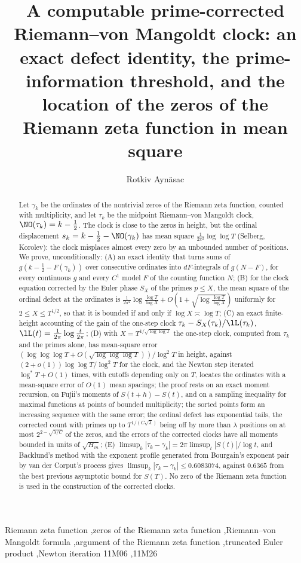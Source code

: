 

\begin{frontmatter}
\title{A computable prime-corrected Riemann--von Mangoldt clock: an exact defect identity, the prime-information threshold, and the location of the zeros of the Riemann zeta function in mean square}
\author{Rotkiv Ayn\"asac}

\begin{abstract}
Let $\gamma_k$ be the ordinates of the nontrivial zeros of the Riemann zeta function, counted with multiplicity, and let $\tau_k$ be the midpoint Riemann--von Mangoldt clock, $\NO(\tau_k)=k-\frac12$. The clock is close to the zeros in height, but the ordinal displacement $s_k=k-\frac12-\NO(\gamma_k)$ has mean square $\frac1{2\pi^2}\log\log T$ (Selberg, Korolev): the clock misplaces almost every zero by an unbounded number of positions. We prove, unconditionally: (A) an exact identity that turns sums of $g(k-\frac12-F(\gamma_k))$ over consecutive ordinates into $dF$-integrals of $g(N-F)$, for every continuous $g$ and every $C^1$ model $F$ of the counting function $N$; (B) for the clock equation corrected by the Euler phase $S_X$ of the primes $p\le X$, the mean square of the ordinal defect at the ordinates is $\frac1{2\pi^2}\log\frac{\log T}{\log X}+O(1+\sqrt{\log\frac{\log T}{\log X}})$ uniformly for $2\le X\le T^{1/2}$, so that it is bounded if and only if $\log X\asymp\log T$; (C) an exact finite-height accounting of the gain of the one-step clock $\tau_k-S_X(\tau_k)/\lL(\tau_k)$, $\lL(t)=\frac1{2\pi}\log\frac t{2\pi}$; (D) with $X=T^{1/\sqrt{\log\log T}}$ the one-step clock, computed from $\tau_k$ and the primes alone, has mean-square error $(\log\log\log T+O(\sqrt{\log\log\log T}))/\log^2T$ in height, against $(2+o(1))\log\log T/\log^2T$ for the clock, and the Newton step iterated $\log^*T+O(1)$ times, with cutoffs depending only on $T$, locates the ordinates with a mean-square error of $O(1)$ mean spacings; the proof rests on an exact moment recursion, on Fujii's moments of $S(t+h)-S(t)$, and on a sampling inequality for maximal functions at points of bounded multiplicity; the sorted points form an increasing sequence with the same error; the ordinal defect has exponential tails, the corrected count with primes up to $T^{1/(C\sqrt\lambda)}$ being off by more than $\lambda$ positions on at most $2^{2-\sqrt{\lambda/C}}$ of the zeros, and the errors of the corrected clocks have all moments bounded in units of $\sqrt{H_m}$; (E) $\limsup_k|\tau_k-\gamma_k|=2\pi\limsup_t|S(t)|/\log t$, and Backlund's method with the exponent profile generated from Bourgain's exponent pair by van der Corput's process gives $\limsup_k|\tau_k-\gamma_k|\le0.6083074$, against $0.6365$ from the best previous asymptotic bound for $S(T)$. No zero of the Riemann zeta function is used in the construction of the corrected clocks.
\end{abstract}

\begin{keyword}
Riemann zeta function \sep zeros of the Riemann zeta function \sep Riemann--von Mangoldt formula \sep argument of the Riemann zeta function \sep truncated Euler product \sep Newton iteration
\MSC[2020] 11M06 \sep 11M26
\end{keyword}
\end{frontmatter}

